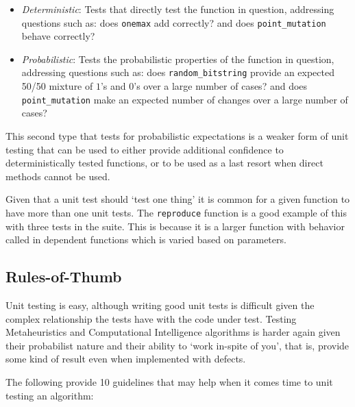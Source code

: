 \begin{itemize}
	\item \emph{Deterministic}: Tests that directly test the function in question, addressing questions such as: does \texttt{onemax} add correctly? and does \texttt{point\_mutation} behave correctly?
	\item \emph{Probabilistic}: Tests the probabilistic properties of the function in question, addressing questions such as: does \texttt{random\_bitstring} provide an expected 50/50 mixture of $1$'s and $0$'s over a large number of cases? and does \texttt{point\_mutation} make an expected number of changes over a large number of cases?
\end{itemize}

This second type that tests for probabilistic expectations is a weaker form of unit testing that can be used to either provide additional confidence to deterministically tested functions, or to be used as a last resort when direct methods cannot be used.

Given that a unit test should `test one thing' it is common for a given function to have more than one unit tests. The \texttt{reproduce} function is a good example of this with three tests in the suite. This is because it is a larger function with behavior called in dependent functions which is varied based on parameters.



%
%
\subsection{Rules-of-Thumb}
\label{sec:suggestions}
Unit testing is easy, although writing good unit tests is difficult given the complex relationship the tests have with the code under test. Testing Metaheuristics and Computational Intelligence algorithms is harder again given their probabilist nature and their ability to `work in-spite of you', that is, provide some kind of result even when implemented with defects.

The following provide 10 guidelines that may help when it comes time to unit testing an algorithm:

